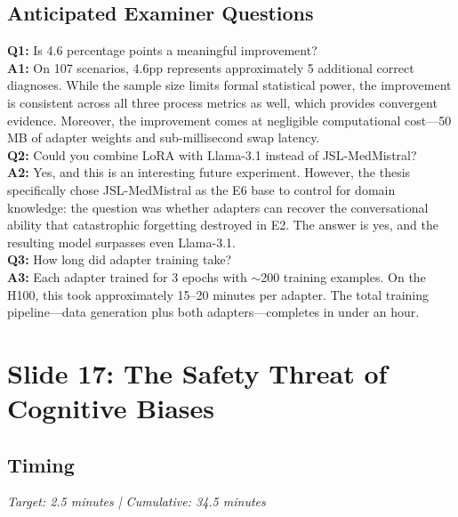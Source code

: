 \subsection*{Anticipated Examiner Questions}
\begin{qabox}
\textbf{Q1:} Is 4.6 percentage points a meaningful improvement? \\
\textbf{A1:} On 107 scenarios, 4.6pp represents approximately 5 additional correct diagnoses. While the sample size limits formal statistical power, the improvement is consistent across all three process metrics as well, which provides convergent evidence. Moreover, the improvement comes at negligible computational cost---50 MB of adapter weights and sub-millisecond swap latency. \\[6pt]
\textbf{Q2:} Could you combine LoRA with Llama-3.1 instead of JSL-MedMistral? \\
\textbf{A2:} Yes, and this is an interesting future experiment. However, the thesis specifically chose JSL-MedMistral as the E6 base to control for domain knowledge: the question was whether adapters can recover the conversational ability that catastrophic forgetting destroyed in E2. The answer is yes, and the resulting model surpasses even Llama-3.1. \\[6pt]
\textbf{Q3:} How long did adapter training take? \\
\textbf{A3:} Each adapter trained for 3 epochs with $\sim$200 training examples. On the H100, this took approximately 15--20 minutes per adapter. The total training pipeline---data generation plus both adapters---completes in under an hour.
\end{qabox}



\section{Slide 17: The Safety Threat of Cognitive Biases}

\subsection*{Timing}
\textit{Target: 2.5 minutes | Cumulative: 34.5 minutes}

